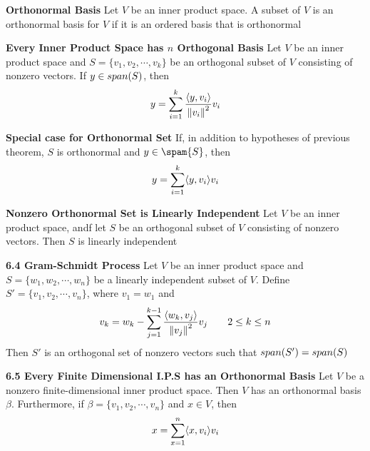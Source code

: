 \documentclass[11pt]{article}
\begin{document}

\begin{defn*}
    \textbf{Orthonormal Basis} Let $V$ be an inner product space. A subset of $V$ is an orthonormal basis for $V$ if it is an ordered basis that is orthonormal
\end{defn*}

\begin{defn*}
    \textbf{Every Inner Product Space has $n$ Orthogonal Basis} Let $V$ be an inner product space and $S = \{ v_1, v_2, \cdots, v_k\}$ be an orthogonal subset of $V$ consisting of nonzero vectors. If $y\in span(S)$, then 
    \[
        y = \sum_{i=1}^k \frac{\langle y,v_i\rangle}{\left\lVert v_i\right\rVert^2} v_i
    \]
\end{defn*}

\begin{corollary*}
    \textbf{Special case for Orthonormal Set} If, in addition to hypotheses of previous theorem, $S$ is orthonormal and $y\in \spam{S}$, then 
    \[
        y = \sum_{i=1}^k \langle y,v_i\rangle v_i    
    \]
\end{corollary*}

\begin{corollary*}
    \textbf{Nonzero Orthonormal Set is Linearly Independent} Let $V$ be an inner product space, andf let $S$ be an orthogonal subset of $V$ consisting of nonzero vectors. Then $S$ is linearly independent
\end{corollary*}

\begin{theorem*}
    \textbf{6.4 Gram-Schmidt Process} Let $V$ be an inner product space and $S = \{w_1,w_2,\cdots, w_n\}$ be a linearly independent subset of $V$. Define $S' = \{v_1,v_2,\cdots, v_n\}$, where $v_1 = w_1$ and 
    \[
        v_k = w_k - \sum_{j=1}^{k-1} \frac{\langle w_k,v_j\rangle}{\left\lVert v_j\right\rVert^2} v_j 
        \quad \quad 
        2\leq k\leq n
    \]
    Then $S'$ is an orthogonal set of nonzero vectors such that $span(S') = span(S)$
\end{theorem*}



\begin{theorem*}
    \textbf{6.5 Every Finite Dimensional I.P.S has an Orthonormal Basis} Let $V$ be a nonzero finite-dimensional inner product space. Then $V$ has an orthonormal basis $\beta$. Furthermore, if $\beta = \{v_1, v_2,\cdots, v_n\}$ and $x\in V$, then 
    \[
        x = \sum_{x=1}^n \langle x,v_i\rangle v_i    
    \]
\end{theorem*}
\end{document}
